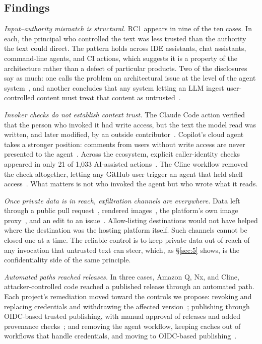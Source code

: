 \documentclass[acmsmall,screen,review]{acmart}
\begin{document}
\subsection{Findings}\label{sec:4.2}

\emph{Input–authority mismatch is structural.} RC1 appears in nine of the ten cases. In each, the principal who controlled the text was less trusted than the authority the text could direct. The pattern holds across IDE assistants, chat assistants, command-line agents, and CI actions, which suggests it is a property of the architecture rather than a defect of particular products. Two of the disclosures say as much: one calls the problem an architectural issue at the level of the agent system~\cite{invariant2025github}, and another concludes that any system letting an LLM ingest user-controlled content must treat that content as untrusted~\cite{mayraz2025remote}.

\emph{Invoker checks do not establish context trust.} The Claude Code action verified that the person who invoked it had write access, but the text the model read was written, and later modified, by an outside contributor~\cite{stawinski2026trusting}. Copilot's cloud agent takes a stronger position: comments from users without write access are never presented to the agent~\cite{githubndrisks}. Across the ecosystem, explicit caller-identity checks appeared in only 21 of 1,033 AI-assisted actions~\cite{wang2026demystifying}. The Cline workflow removed the check altogether, letting any GitHub user trigger an agent that held shell access~\cite{khan2026clinejection}. What matters is not who invoked the agent but who wrote what it reads.

\emph{Once private data is in reach, exfiltration channels are everywhere.} Data left through a public pull request~\cite{invariant2025github}, rendered images~\cite{mayraz2025remote}, the platform's own image proxy~\cite{mayraz2025camoleak}, and an edit to an issue~\cite{daelman2025prompt}. Allow-listing destinations would not have helped where the destination was the hosting platform itself. Such channels cannot be closed one at a time. The reliable control is to keep private data out of reach of any invocation that untrusted text can steer, which, as \S\ref{sec:5} shows, is the confidentiality side of the same principle.

\emph{Automated paths reached releases.} In three cases, Amazon Q, Nx, and Cline, attacker-controlled code reached a published release through an automated path. Each project's remediation moved toward the controls we propose: revoking and replacing credentials and withdrawing the affected version~\cite{amazon2025security}; publishing through OIDC-based trusted publishing, with manual approval of releases and added provenance checks~\cite{nx2025s1ngularity}; and removing the agent workflow, keeping caches out of workflows that handle credentials, and moving to OIDC-based publishing~\cite{cline2026post}.
\end{document}
